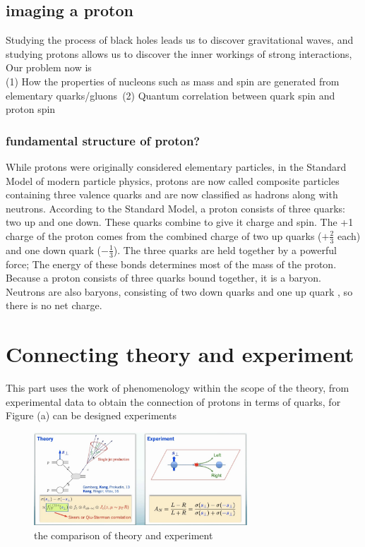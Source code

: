 \documentclass[12pt, a4paper, oneside]{article}
\begin{document}
\begin{spacing}{2.0}
\subsection{imaging a proton}
Studying the process of black holes leads us to discover gravitational waves, and studying protons allows us to discover the inner workings of strong interactions,
Our problem now is \\
(1) How the properties of nucleons such as mass and spin are generated from elementary quarks/gluons\
(2) Quantum correlation between quark spin and proton spin
\subsubsection{fundamental structure of proton?}
While protons were originally considered elementary particles, in the Standard Model of modern particle physics, protons are now called composite particles containing three valence quarks and are now classified as hadrons along with neutrons.
According to the Standard Model, a proton consists of three quarks: two up and one down. These quarks combine to give it charge and spin.
The +1 charge of the proton comes from the combined charge of two up quarks ($+\frac{2}{3}$ each) and one down quark ($-\frac{1}{3}$). The three quarks are held together by a powerful force;
The energy of these bonds determines most of the mass of the proton. Because a proton consists of three quarks bound together, it is a baryon. Neutrons are also baryons, consisting of two down quarks and one up quark
, so there is no net charge.

\section{Connecting theory and experiment}
This part uses the work of phenomenology within the scope of the theory, from experimental data to obtain the connection of protons in terms of quarks, for Figure (a) can be designed experiments

\begin{figure}
    \centering
    \includegraphics[width=8cm]{theory and experiment.jpg}
    \caption{the comparison of theory and experiment}
\end{figure}



\end{spacing}
\end{document}
